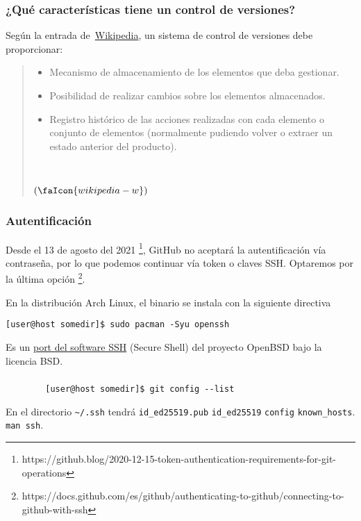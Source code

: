 \begin{frame}
	\frametitle{¿Qué características tiene un control de versiones?}

	Según la entrada de~\href{https://es.wikipedia.org}{Wikipedia},
	un sistema de control de versiones debe proporcionar:

	\begin{quote}\itshape
		\begin{itemize}
			\item
			
			Mecanismo de almacenamiento de los elementos que deba
			gestionar.
			
			\item
			
			Posibilidad de realizar cambios sobre los elementos
			almacenados.
			
			\item
			
			Registro histórico de las acciones realizadas con cada
			elemento o conjunto de elementos (normalmente pudiendo
			volver o extraer un estado anterior del producto).
		\end{itemize}

		\

		\noindent\hfill\color{DarkBlue}$\left(\faIcon{wikipedia-w}\right)$
	\end{quote}

\end{frame}

\begin{frame}[fragile]
	\frametitle{Autentificación}
	Desde el 13 de agosto del 2021
	\footnote{https://github.blog/2020-12-15-token-authentication-requirements-for-git-operations},
	GitHub no aceptará la autentificación vía contraseña, por lo que
	podemos continuar vía token o claves SSH.
	Optaremos por la última opción
	\footnote{https://docs.github.com/es/github/authenticating-to-github/connecting-to-github-with-ssh}.

	En la distribución Arch Linux, el binario se instala con la
	siguiente directiva

	\begin{verbatim}
[user@host somedir]$ sudo pacman -Syu openssh
    \end{verbatim}

	Es un \href{https://www.openssh.com}{port del software SSH}
	(Secure Shell) del proyecto OpenBSD bajo la licencia BSD.
\end{frame}

\begin{frame}[fragile]
	\frametitle{}

	\begin{verbatim}
		[user@host somedir]$ git config --list
	\end{verbatim}

	En el directorio \lstinline|~/.ssh| tendrá
	\lstinline|id_ed25519.pub| \lstinline|id_ed25519|
	\lstinline|config| \lstinline|known_hosts|.
	\lstinline|man ssh|.
\end{frame}


